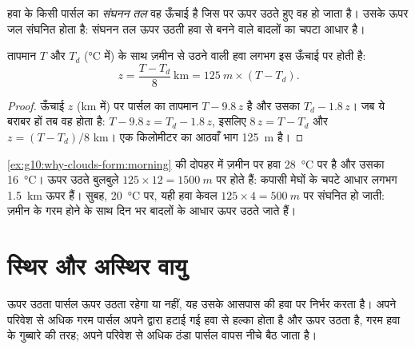 \begin{definition}[संघनन तल]\label{def:g10:why-clouds-form:condensation-level}
हवा के किसी पार्सल का \emph{संघनन तल} वह ऊँचाई है जिस पर ऊपर उठते
हुए वह  हो जाता है। उसके ऊपर जल संघनित होता है:
संघनन तल ऊपर उठती हवा से बनने वाले बादलों का चपटा
आधार है।
\end{definition}

\begin{proposition}[संघनन तल की ऊँचाई]\label{prop:g10:why-clouds-form:lcl}
तापमान $T$ और  $T_d$
(\unit{\degreeCelsius} में) के साथ ज़मीन से उठने वाली हवा लगभग इस ऊँचाई पर  होती है:
\[
  z = \frac{T - T_d}{8}\ \text{km} = \qty{125}{m} \times (T - T_d).
\]
\end{proposition}

\begin{proof}
ऊँचाई $z$ (km में) पर पार्सल का तापमान $T - 9.8\,z$ है और उसका
 $T_d - 1.8\,z$। जब ये बराबर हों तब वह  होता है:
$T - 9.8\,z = T_d - 1.8\,z$, इसलिए $8\,z = T - T_d$ और $z = (T - T_d)/8$ km।
एक किलोमीटर का आठवाँ भाग \qty{125}{m} है।
\end{proof}

\begin{example}[दोपहर का एक कपासी मेघ]\label{ex:g10:why-clouds-form:base}
\cref{ex:g10:why-clouds-form:morning} की दोपहर में ज़मीन पर हवा
\qty{28}{\degreeCelsius} पर है और उसका 
\qty{16}{\degreeCelsius}। ऊपर उठते बुलबुले
$125 \times 12 = \qty{1500}{m}$ पर  होते हैं: कपासी मेघों के चपटे आधार लगभग
\qty{1.5}{km} ऊपर हैं। सुबह, \qty{20}{\degreeCelsius} पर, यही हवा
केवल $125 \times 4 = \qty{500}{m}$ पर संघनित हो जाती: ज़मीन के गरम होने के साथ दिन भर
बादलों के आधार ऊपर उठते जाते हैं।
\end{example}

\section{स्थिर और अस्थिर वायु}

ऊपर उठता पार्सल ऊपर उठता रहेगा या नहीं, यह उसके आसपास की हवा पर निर्भर करता है। अपने
परिवेश से अधिक गरम पार्सल अपने द्वारा हटाई गई हवा से हल्का होता है और ऊपर उठता है,
गरम हवा के गुब्बारे की तरह; अपने परिवेश से अधिक ठंडा पार्सल वापस नीचे बैठ जाता है।

